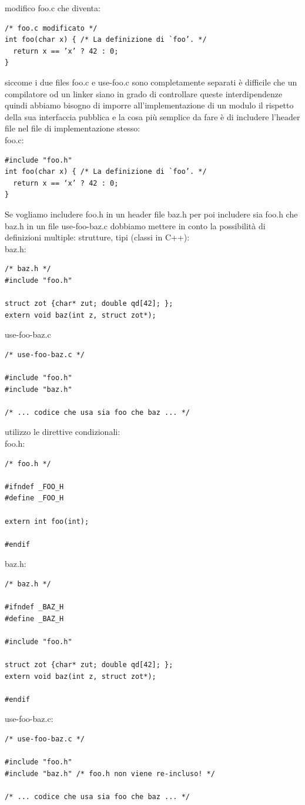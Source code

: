 \documentclass[a4paper,12pt, oneside]{book}
\begin{document}
modifico foo.c che diventa:
\begin{verbatim}
/* foo.c modificato */
int foo(char x) { /* La definizione di `foo’. */
  return x == ’x’ ? 42 : 0;
}
\end{verbatim}
\newpage
siccome i due files foo.c e use-foo.c sono completamente
separati è difficile che un compilatore od un linker siano in grado di controllare queste interdipendenze quindi abbiamo bisogno di imporre all'implementazione di un modulo il
rispetto della sua interfaccia pubblica e la cosa più semplice da fare è di includere l’header file nel file di
implementazione stesso:
\\
foo.c:
\begin{verbatim}
#include "foo.h"
int foo(char x) { /* La definizione di `foo’. */
  return x == ‘x’ ? 42 : 0;
}
\end{verbatim}
Se vogliamo includere foo.h in un header file baz.h per poi includere sia foo.h che baz.h in un file use-foo-baz.c dobbiamo mettere in conto la possibilità di definizioni multiple: strutture, tipi (classi in C++):
\\
baz.h:
\begin{verbatim}
/* baz.h */
#include "foo.h"

struct zot {char* zut; double qd[42]; };
extern void baz(int z, struct zot*);
\end{verbatim}
use-foo-baz.c
\begin{verbatim}
/* use-foo-baz.c */

#include "foo.h"
#include "baz.h"

/* ... codice che usa sia foo che baz ... */
\end{verbatim}
utilizzo le direttive condizionali:\\
foo.h:
\begin{verbatim}
/* foo.h */

#ifndef _FOO_H
#define _FOO_H

extern int foo(int);

#endif
\end{verbatim}
baz.h:
\begin{verbatim}
/* baz.h */

#ifndef _BAZ_H
#define _BAZ_H

#include "foo.h"

struct zot {char* zut; double qd[42]; };
extern void baz(int z, struct zot*);

#endif
\end{verbatim}
use-foo-baz.c:
\begin{verbatim}
/* use-foo-baz.c */

#include "foo.h"
#include "baz.h" /* foo.h non viene re-incluso! */

/* ... codice che usa sia foo che baz ... */
\end{verbatim}
\end{document}
